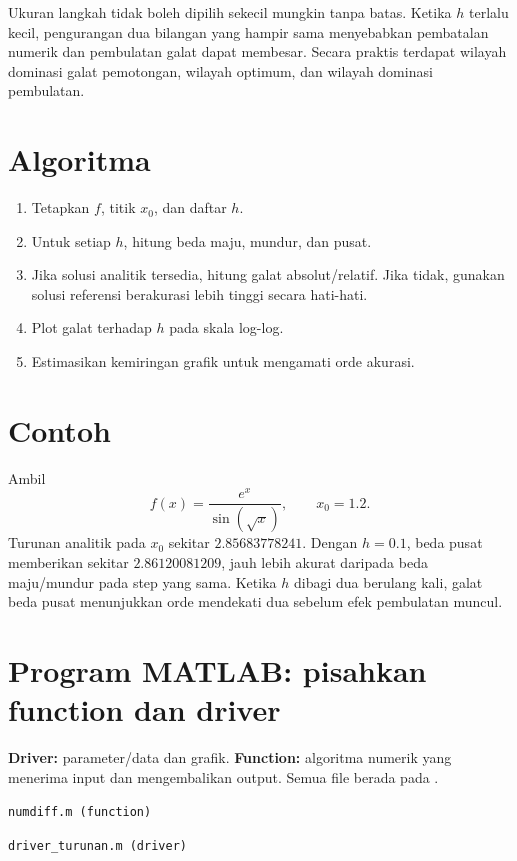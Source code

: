 \documentclass[book,english,noindex,lean,nobackpage,nocopyright,noupdate,nofiglist,notablist]{enacom}
\newcommand{\MatlabFile}[1]{\par\smallskip\noindent\texttt{#1}\par}
\begin{document}
Ukuran langkah tidak boleh dipilih sekecil mungkin tanpa batas. Ketika $h$ terlalu kecil, pengurangan dua bilangan yang hampir sama menyebabkan pembatalan numerik dan pembulatan galat dapat membesar. Secara praktis terdapat wilayah dominasi galat pemotongan, wilayah optimum, dan wilayah dominasi pembulatan.

\section{Algoritma}
\begin{enumerate}
\item Tetapkan $f$, titik $x_0$, dan daftar $h$.
\item Untuk setiap $h$, hitung beda maju, mundur, dan pusat.
\item Jika solusi analitik tersedia, hitung galat absolut/relatif. Jika tidak, gunakan solusi referensi berakurasi lebih tinggi secara hati-hati.
\item Plot galat terhadap $h$ pada skala log-log.
\item Estimasikan kemiringan grafik untuk mengamati orde akurasi.
\end{enumerate}

\section{Contoh}
Ambil
\begin{equation}
f(x)=\frac{e^x}{\sin(\sqrt{x})},\qquad x_0=1.2.
\end{equation}
Turunan analitik pada $x_0$ sekitar $2.85683778241$. Dengan $h=0.1$, beda pusat memberikan sekitar $2.86120081209$, jauh lebih akurat daripada beda maju/mundur pada step yang sama. Ketika $h$ dibagi dua berulang kali, galat beda pusat menunjukkan orde mendekati dua sebelum efek pembulatan muncul.

\section{Program MATLAB: pisahkan function dan driver}
\textbf{Driver:} parameter/data dan grafik. \textbf{Function:} algoritma numerik yang menerima input dan mengembalikan output. Semua file berada pada .

\MatlabFile{numdiff.m (function)}


\MatlabFile{driver\_turunan.m (driver)}

\end{document}

